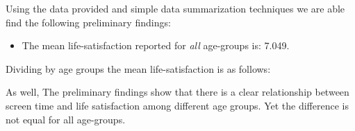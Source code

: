 \documentclass[12pt, a4paper]{article}
\begin{document}
\par Using the data provided and simple data summarization techniques we are able find the following preliminary findings:
\begin{itemize}
    \item The mean life-satisfaction reported for \textit{all} age-groups is:  7.049.
\end{itemize}
Dividing by age groups the mean life-satisfaction is as follows:
\begin{table}[hb]
    \centering
    \end{table}
\par As well, The preliminary findings show that there is a clear relationship between screen time and life satisfaction among different age groups.
Yet the difference is not equal for all age-groups.
\end{document}
